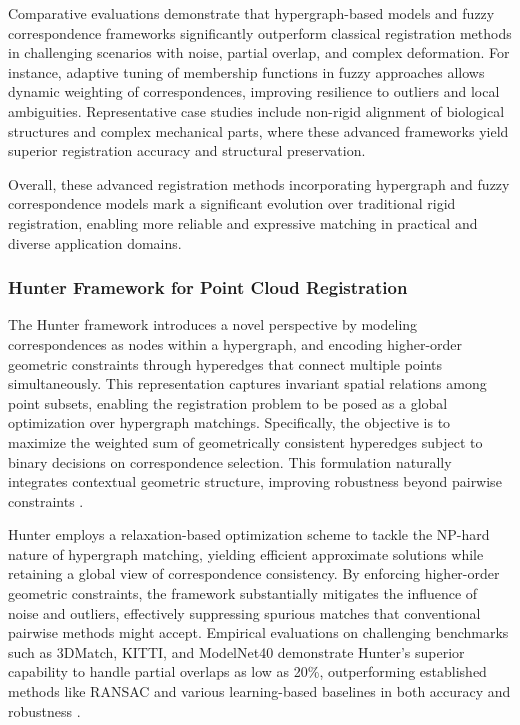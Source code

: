 \documentclass[sigconf]{acmart}
\begin{document}
Comparative evaluations demonstrate that hypergraph-based models and fuzzy correspondence frameworks significantly outperform classical registration methods in challenging scenarios with noise, partial overlap, and complex deformation. For instance, adaptive tuning of membership functions in fuzzy approaches allows dynamic weighting of correspondences, improving resilience to outliers and local ambiguities. Representative case studies include non-rigid alignment of biological structures and complex mechanical parts, where these advanced frameworks yield superior registration accuracy and structural preservation.

Overall, these advanced registration methods incorporating hypergraph and fuzzy correspondence models mark a significant evolution over traditional rigid registration, enabling more reliable and expressive matching in practical and diverse application domains.

\subsubsection{Hunter Framework for Point Cloud Registration}

The Hunter framework introduces a novel perspective by modeling correspondences as nodes within a hypergraph, and encoding higher-order geometric constraints through hyperedges that connect multiple points simultaneously. This representation captures invariant spatial relations among point subsets, enabling the registration problem to be posed as a global optimization over hypergraph matchings. Specifically, the objective is to maximize the weighted sum of geometrically consistent hyperedges subject to binary decisions on correspondence selection. This formulation naturally integrates contextual geometric structure, improving robustness beyond pairwise constraints \cite{ref6}.

Hunter employs a relaxation-based optimization scheme to tackle the NP-hard nature of hypergraph matching, yielding efficient approximate solutions while retaining a global view of correspondence consistency. By enforcing higher-order geometric constraints, the framework substantially mitigates the influence of noise and outliers, effectively suppressing spurious matches that conventional pairwise methods might accept. Empirical evaluations on challenging benchmarks such as 3DMatch, KITTI, and ModelNet40 demonstrate Hunter’s superior capability to handle partial overlaps as low as 20\%, outperforming established methods like RANSAC and various learning-based baselines in both accuracy and robustness \cite{ref6}.
\end{document}
